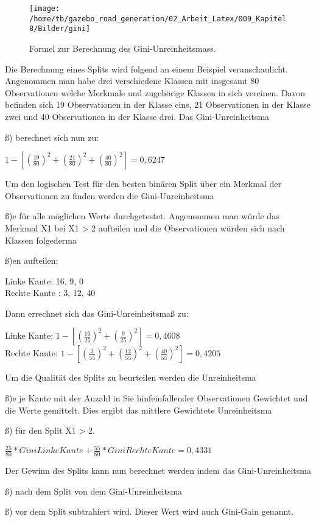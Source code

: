 \begin{figure}[H]
\begin{center}
  \texttt{[image: /home/tb/gazebo\_road\_generation/02\_Arbeit\_Latex/009\_Kapitel8/Bilder/gini]}%
  \caption[Formel zur Berechnung des Gini-Unreinheitsmass]%
           {\label{fig:Formel zur Berechnung des Gini-Unreinheitsmass}%
           Formel zur Berechnung des Gini-Unreinheitsmass.
           }
\end{center}
\end{figure}

Die Berechnung eines Splits wird folgend an einem Beispiel veranschaulicht.
Angenommen man habe drei verschiedene Klassen mit insgesamt 80 Observationen welche Merkmale und zugeh{\"o}rige Klassen in sich vereinen.
Davon befinden sich 19 Observationen in der Klasse eins, 21 Observationen in der Klasse zwei und 40 Observationen in der Klasse drei. Das Gini-Unreinheitsma{\ss) berechnet sich nun zu:


$1- [ (\frac{19}{80})^2 + (\frac{21}{80})^2 + (\frac{40}{80})^2] = 0,6247$


Um den logischen Test f{\"u}r den besten bin{\"a}ren Split {\"u}ber ein Merkmal der Observationen zu finden werden die Gini-Unreinheitsma{\ss)e f{\"u}r alle m{\"o}glichen Werte durchgetestet.
Angenommen man w{\"u}rde das Merkmal X1 bei X1 > 2 aufteilen und die Observationen w{\"u}rden sich nach Klassen folgederma{\ss)en aufteilen:

Linke Kante: 16, 9, 0\\
Rechte Kante : 3, 12, 40

Dann errechnet sich das Gini-Unreinheitsma{\ss} zu:

Linke Kante:   $1 - [ (\frac{16}{25})^2 + (\frac{9}{25})^2] = 0,4608$\\
Rechte Kante: $1 - [ (\frac{3}{55})^2 + (\frac{12}{55})^2+ (\frac{40}{55})^2] = 0,4205$

Um die Qualit{\"a}t des Splits zu beurteilen werden die Unreinheitsma{\ss)e je Kante mit der Anzahl in Sie hinfeinfallender Observationen Gewichtet und die Werte gemittelt. 
Dies ergibt das mittlere Gewichtete Unreinheitsma{\ss) f{\"u}r den Split X1 > 2.

$\frac{25}{80} * Gini Linke Kante + \frac{55}{80} * Gini Rechte Kante = 0,4331$

Der Gewinn des Splits kann nun berechnet werden indem das Gini-Unreinheitsma{\ss) nach dem Split von dem Gini-Unreinheitsma{\ss) vor dem Split subtrahiert wird. Dieser Wert wird auch Gini-Gain genannt. 

}}}}}}}
